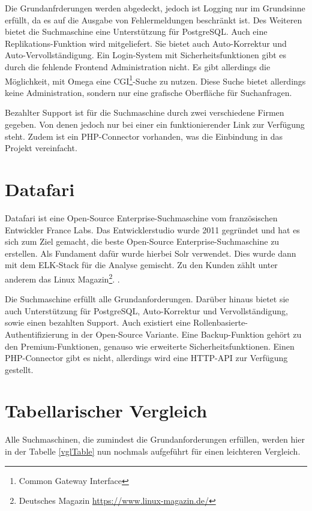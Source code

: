 Die Grundanfrderungen werden abgedeckt, jedoch ist Logging nur im Grundsinne erfüllt, da es auf die Ausgabe von Fehlermeldungen beschränkt ist. Des Weiteren bietet die Suchmaschine eine Unterstützung für PostgreSQL. Auch eine Replikations-Funktion wird mitgeliefert. Sie bietet auch Auto-Korrektur und Auto-Vervollständigung. Ein Login-System mit Sicherheitsfunktionen gibt es durch die fehlende Frontend Administration nicht. Es gibt allerdings die Möglichkeit, mit Omega eine CGI\footnote{Common Gateway Interface}-Suche zu nutzen. Diese Suche bietet allerdings keine Administration, sondern nur eine grafische Oberfläche für Suchanfragen.

Bezahlter Support ist für die Suchmaschine durch zwei verschiedene Firmen gegeben. Von denen jedoch nur bei einer ein funktionierender Link zur Verfügung steht. Zudem ist ein PHP-Connector vorhanden, was die Einbindung in das Projekt vereinfacht. \cite{XAP.2019}

\section{Datafari}
\label{datafari}

Datafari ist eine Open-Source Enterprise-Suchmaschine vom französischen Entwickler France Labs. Das Entwicklerstudio wurde 2011 gegründet und hat es sich zum Ziel gemacht, die beste Open-Source Enterprise-Suchmaschine zu erstellen. \cite{Labs.2019} Als Fundament dafür wurde hierbei Solr verwendet. Dies wurde dann mit dem ELK-Stack für die Analyse gemischt. Zu den Kunden zählt unter anderem das Linux Magazin\footnote{Deutsches Magazin \url{https://www.linux-magazin.de/}}. \cite{MichaelBrandenburg.2019}.

Die Suchmaschine erfüllt alle Grundanforderungen. Darüber hinaus bietet sie auch Unterstützung für PostgreSQL, Auto-Korrektur und Vervollständigung, sowie einen bezahlten Support. Auch existiert eine Rollenbasierte-Authentifizierung in der Open-Source Variante. Eine Backup-Funktion gehört zu den Premium-Funktionen, genauso wie erweiterte Sicherheitsfunktionen. Einen PHP-Connector gibt es nicht, allerdings wird eine HTTP-API zur Verfügung gestellt. \cite{Labs.b}

\newpage
\section{Tabellarischer Vergleich}

Alle Suchmaschinen, die zumindest die Grundanforderungen erfüllen, werden hier in der Tabelle \ref{vglTable} nun nochmals aufgeführt für einen leichteren Vergleich.

